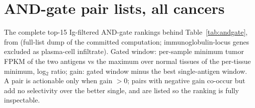 \section{AND-gate pair lists, all cancers}
{\sloppy The complete top-15 Ig-filtered AND-gate rankings behind Table~\ref{tab:andgate}, from  (full-list dump of the committed  computation; immunoglobulin-locus genes excluded as plasma-cell infiltrate). Gated window: per-sample minimum tumor FPKM of the two antigens vs the maximum over normal tissues of the per-tissue minimum, log$_2$ ratio; gain: gated window minus the best single-antigen window. A pair is actionable only when gain $>0$; pairs with negative gain co-occur but add no selectivity over the better single, and are listed so the ranking is fully inspectable.\par}
